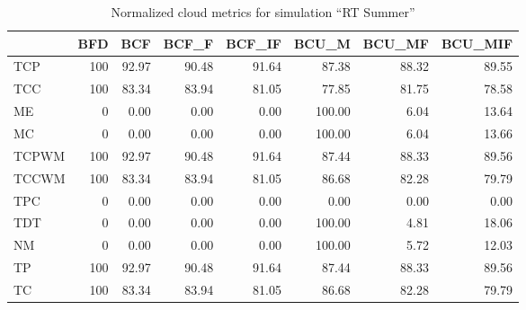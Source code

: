\begin{table}[ht]
\centering
\begin{tabular}{lrrrrrrr}
\toprule
{} &  BFD &    BCF &  BCF\_F &  BCF\_IF &   BCU\_M &  BCU\_MF &  BCU\_MIF \\
\midrule
TCP   &  100 &  92.97 &  90.48 &   91.64 &   87.38 &   88.32 &    89.55 \\
TCC   &  100 &  83.34 &  83.94 &   81.05 &   77.85 &   81.75 &    78.58 \\
ME    &    0 &   0.00 &   0.00 &    0.00 &  100.00 &    6.04 &    13.64 \\
MC    &    0 &   0.00 &   0.00 &    0.00 &  100.00 &    6.04 &    13.66 \\
TCPWM &  100 &  92.97 &  90.48 &   91.64 &   87.44 &   88.33 &    89.56 \\
TCCWM &  100 &  83.34 &  83.94 &   81.05 &   86.68 &   82.28 &    79.79 \\
TPC   &    0 &   0.00 &   0.00 &    0.00 &    0.00 &    0.00 &     0.00 \\
TDT   &    0 &   0.00 &   0.00 &    0.00 &  100.00 &    4.81 &    18.06 \\
NM    &    0 &   0.00 &   0.00 &    0.00 &  100.00 &    5.72 &    12.03 \\
TP    &  100 &  92.97 &  90.48 &   91.64 &   87.44 &   88.33 &    89.56 \\
TC    &  100 &  83.34 &  83.94 &   81.05 &   86.68 &   82.28 &    79.79 \\
\bottomrule
\end{tabular}
\caption{Normalized cloud metrics for simulation "`RT Summer"'}
\end{table}

